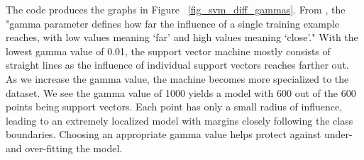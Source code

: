 \documentclass[12pt]{article}
\begin{document}
The code produces the graphs in Figure ~\ref{fig_svm_diff_gammas}. From \cite{scikit_rbf_parameters}, the "gamma parameter defines how far the influence of a single training example reaches, with low values meaning ‘far’ and high values meaning ‘close’." With the lowest gamma value of 0.01, the support vector machine mostly consists of straight lines as the influence of individual support vectors reaches farther out. As we increase the gamma value, the machine becomes more specialized to the dataset. We see the gamma value of 1000 yields a model with 600 out of the 600 points being support vectors. Each point has only a small radius of influence, leading to an extremely localized model with margins closely following the class boundaries. Choosing an appropriate gamma value helps protect against under- and over-fitting the model.
\end{document}
